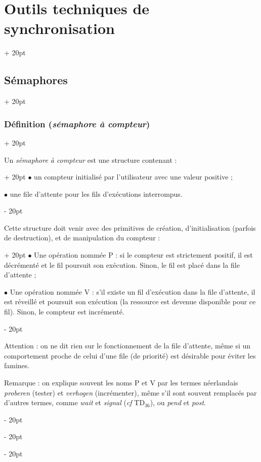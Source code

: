 \documentclass[a4paper, 12pt, twoside]{article}
\newcommand{\ind}[1][20pt]{\advance\leftskip + #1}
\newcommand{\deind}[1][20pt]{\advance\leftskip - #1}
\newenvironment{indt}[2][20pt]{#2 \par \ind[#1]}{\par \deind} %
\begin{document}
\begin{indt}{\section{Outils techniques de synchronisation}}
\begin{indt}{\subsection{Sémaphores}}
            \vspace{12pt}
            
            \begin{indt}{\subsubsection{Définition (\emph{sémaphore à compteur})}}
                \label{3.2.2}

                \begin{indt}{Un \emph{sémaphore à compteur} est une structure contenant :}
                    $\bullet$ un compteur initialisé par l'utilisateur avec une valeur positive ;

                    $\bullet$ une file d'attente pour les fils d'exécutions interrompus.
                \end{indt}

                \vspace{12pt}
                
                \begin{indt}{Cette structure doit venir avec des primitives de création, d'initialisation (parfois de destruction), et de manipulation du compteur :}
                    $\bullet$ Une opération nommée P : si le compteur est strictement positif, il est décrémenté et le fil poursuit son exécution. Sinon, le fil est placé dans la file d'attente ;

                    $\bullet$ Une opération nommée V : s'il existe un fil d'exécution dans la file d'attente, il est réveillé et poursuit son exécution (la ressource est devenue disponible pour ce fil).
                    Sinon, le compteur est incrémenté.
                \end{indt}

                \vspace{12pt}
                
                Attention : on ne dit rien sur le fonctionnement de la file d'attente, même si un comportement proche de celui d'une file (de priorité) est désirable pour éviter les famines.

                \vspace{12pt}
                
                Remarque : on explique souvent les noms P et V par les termes néerlandais \textit{proberen} (tester) et \textit{verhogen} (incrémenter), même s'il sont souvent remplacés par d'autres termes, comme \textit{wait} et \textit{signal} (\textit{cf} TD$_{36}$), ou \textit{pend} et \textit{post}.
            \end{indt}


\end{indt}
\end{indt}
\end{document}

